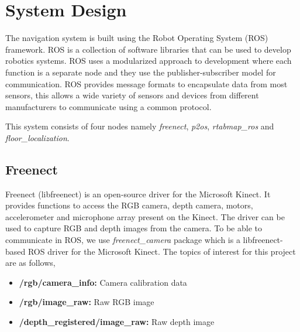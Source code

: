 \documentclass[conference, letterpaper]{IEEEtran}
\begin{document}
\section{System Design}

The navigation system is built using the Robot Operating System (ROS) framework.
ROS is a collection of software libraries that can be used to develop robotics 
systems. ROS uses a modularized approach to development where each function is 
a separate node and they use the publisher-subscriber model for communication. 
ROS provides message formats to encapsulate data from most sensors, this allows
a wide variety of sensors and devices from different manufacturers to 
communicate using a common protocol.

This system consists of four nodes namely \textit{freenect}, \textit{p2os}, 
\textit{rtabmap\_ros} and \textit{floor\_localization}.

\subsection{Freenect}

Freenect (libfreenect) is an open-source driver for the Microsoft Kinect. It
provides functions to access the RGB camera, depth camera, motors, 
accelerometer and microphone array present on the Kinect. The driver can be 
used to capture RGB and depth images from the camera. To be able to 
communicate in ROS, we use \emph{freenect\_camera} package which is a 
libfreenect-based ROS driver for the Microsoft Kinect. The topics of interest 
for this project are as follows,
\begin{itemize}
  \item \textbf{/rgb/camera\_info:} Camera calibration data
  \item \textbf{/rgb/image\_raw:} Raw RGB image
  \item \textbf{/depth\_registered/image\_raw:} Raw depth image
\end{itemize}
\end{document}
